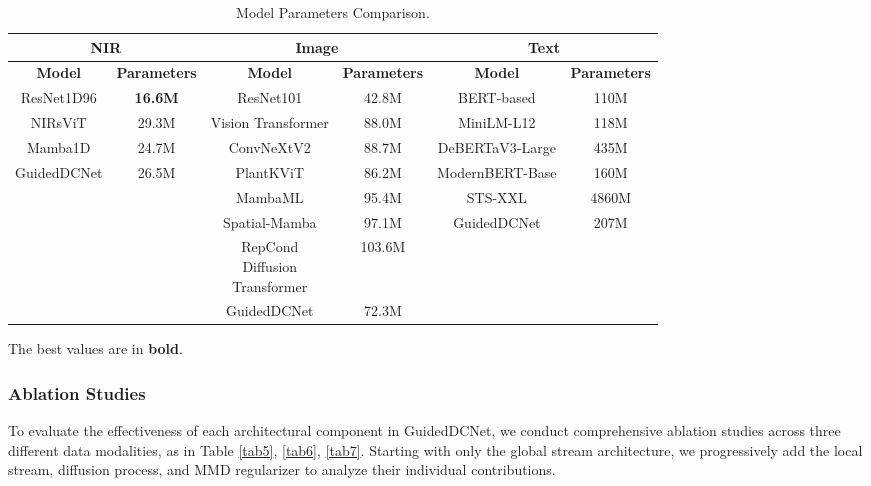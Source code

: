 \documentclass[a4paper,fleqn]{cas-sc}
\begin{document}
\begin{table}[!h]
\centering
\begin{threeparttable}
\caption{Model Parameters Comparison.}
\label{tab4}
\renewcommand{\arraystretch}{1.2}
\begin{tabular}{c c c c c c}
\hline
\multicolumn{2}{c}{\textbf{NIR}} & \multicolumn{2}{c}{\textbf{Image}} & \multicolumn{2}{c}{\textbf{Text}} \\
\hline
\textbf{Model} & \textbf{Parameters} & \textbf{Model} & \textbf{Parameters} & \textbf{Model} & \textbf{Parameters} \\
\hline
ResNet1D96 & \textbf{16.6M} & ResNet101 & 42.8M & BERT-based & 110M \\
NIRsViT & 29.3M & Vision Transformer & 88.0M & MiniLM-L12 & 118M \\
Mamba1D & 24.7M & ConvNeXtV2 & 88.7M & DeBERTaV3-Large & 435M \\
GuidedDCNet & 26.5M & PlantKViT & 86.2M & ModernBERT-Base & 160M \\
& & MambaML & 95.4M & STS-XXL & 4860M \\
& & Spatial-Mamba & 97.1M & GuidedDCNet & 207M \\
& & \makecell{RepCond \\ Diffusion \\ Transformer} & 103.6M & & \\
& & GuidedDCNet & 72.3M & & \\
\hline
\end{tabular}
\begin{tablenotes}
\footnotesize
\item The best values are in \textbf{bold}.
\end{tablenotes}
\end{threeparttable}
\end{table}

\subsubsection{Ablation Studies}

To evaluate the effectiveness of each architectural component in GuidedDCNet, we conduct comprehensive ablation studies across three different data modalities, as in Table \ref{tab5}, \ref{tab6}, \ref{tab7}. Starting with only the global stream architecture, we progressively add the local stream, diffusion process, and MMD regularizer to analyze their individual contributions.
\end{document}
